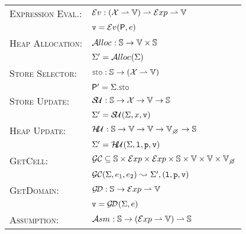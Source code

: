  \begin{figure}[h!]
 \begin{tabular}{ll}
 \textsc{Expression Eval.:} & $\mathcal{E}v_{} :  (\mathcal{X} \rightharpoonup \mathbb{V})  \rightharpoonup \mathcal{E}xp \rightharpoonup \mathbb{V}$ \\ 
                                                    & $\mathtt{v} = \mathcal{E}v_{}({\sf P}, e)$ \\[2pt]
 \textsc{Heap Allocation:}            & $\mathcal{A}lloc_{}: \mathbb{S} \rightarrow \mathbb{V} \times \mathbb{S}$ \\ 
                                                    & $\Sigma' = \mathcal{A}lloc_{}(\Sigma)$ \\[2pt]
\textsc{Store Selector:}                & $\stosel : \absstates \rightarrow (\jvars \partialmap \absvals)$ \\ 
                                                     & $\absstore' = \absstate.\stosel$ \\[2pt]
% 
\textsc{Store Update:}                 & $\mathcal{S\!U}_{}: \mathbb{S} \rightarrow \mathcal{X} \rightarrow \mathbb{V} \rightarrow \mathbb{S}$ \\
                                                    & $\Sigma' = \mathcal{S\!U}_{}(\Sigma, x, \mathtt{v})$ \\[2pt]
%             
\textsc{Heap Update:}                 & $\hpupdt{} : \absstates \rightarrow \absvals \rightarrow \absvals \rightarrow \setext{\absvals}{\none} \rightarrow \absstates$\\
                                                    & $\Sigma' = \mathcal{H\!U}_{}(\Sigma, \mathtt{l}, \mathtt{p}, \mathtt{v})$ \\[2pt]
 \textsc{GetCell:}                         & $\getcell \subseteq \absstates \times \exprs \times \exprs \times \absstates \times \absvals \times \absvals \times \setext{\absvals}{\none}$ \\ 
                                                    & $\mathcal{GC}(\Sigma, e_1, e_2) \leadsto_{} \Sigma', (\mathtt{l}, \mathtt{p}, \mathtt{v})$ \\[2pt]
%
 \textsc{GetDomain:}                   & $\mathcal{G\!D} : \mathbb{S} \rightarrow \mathcal{E}xp \rightharpoonup \mathbb{V}$ \\ 
                                                    & $\mathtt{v} = \mathcal{G\!D}_{}(\Sigma, e)$ \\[2pt]
% 
\textsc{Assumption:}                   & $\mathcal{A}{sm}_{} : \mathbb{S} \rightarrow (\mathcal{E}xp \rightharpoonup \mathbb{V}) \rightharpoonup \mathbb{S}$ \\ 

\end{tabular}
\end{figure}
